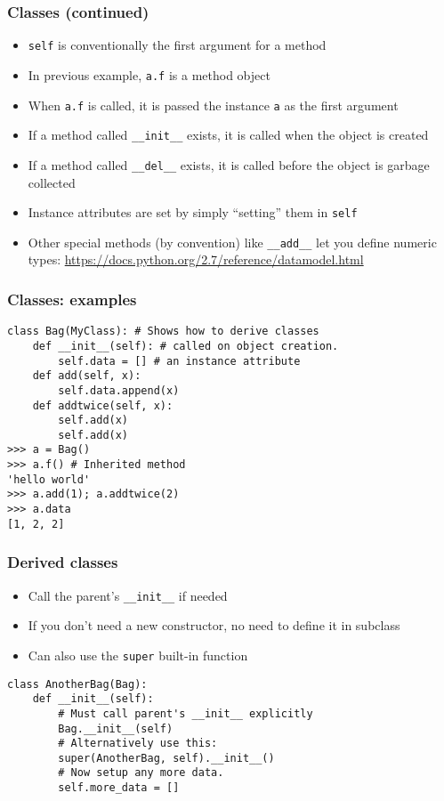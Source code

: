 \begin{frame}[fragile]
  \frametitle{Classes (continued)}
  \begin{itemize}
  \item \texttt{self} is \alert{conventionally} the first argument for a
    method
  \item In previous example, \texttt{a.f} is a method object
  \item When \texttt{a.f} is called, it is passed the instance \texttt{a} as
    the first argument
  \item If a method called \verb+__init__+ exists, it is called when
    the object is created
  \item If a method called \verb+__del__+ exists, it is called before
    the object is garbage collected
  \item Instance attributes are set by simply ``setting'' them in
    \texttt{self}
  \item Other special methods (by convention) like \verb+__add__+ let
    you define numeric types:
    {\footnotesize \url{https://docs.python.org/2.7/reference/datamodel.html}
    }
  \end{itemize}
\end{frame}

\begin{frame}[fragile]
  \frametitle{Classes: examples}
\begin{lstlisting}
class Bag(MyClass): # Shows how to derive classes
    def __init__(self): # called on object creation.
        self.data = [] # an instance attribute
    def add(self, x):
        self.data.append(x)
    def addtwice(self, x):
        self.add(x)
        self.add(x)
>>> a = Bag()
>>> a.f() # Inherited method
'hello world'
>>> a.add(1); a.addtwice(2)
>>> a.data
[1, 2, 2]
\end{lstlisting}
\end{frame}

\begin{frame}[fragile]
  \frametitle{Derived classes}
  \begin{itemize}
  \item Call the parent's \verb+__init__+ if needed
  \item If you don't need a new constructor, no need to define it in subclass
  \item Can also use the \verb+super+ built-in function
  \end{itemize}
\begin{lstlisting}
class AnotherBag(Bag):
    def __init__(self):
        # Must call parent's __init__ explicitly
        Bag.__init__(self)
        # Alternatively use this:
        super(AnotherBag, self).__init__()
        # Now setup any more data.
        self.more_data = []
\end{lstlisting}
\end{frame}

